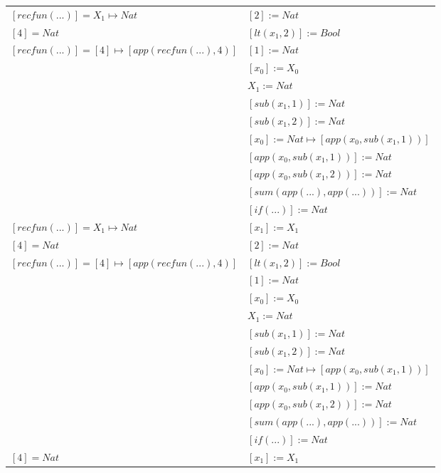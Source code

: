 \begin{exercise}
\begin{description}
\begin{center}
\begin{longtable}{ | l | l | }
                        $[recfun(...)] = X_1 \mapsto Nat$ & $[2] := Nat$ \\
                        $[4] = Nat$ & $[lt(x_1 , 2)] := Bool$ \\
                        $[recfun(...)] = [4] \mapsto [app(recfun(...), 4)]$ & $[1] := Nat$\\
                        & $[x_0] := X_0$ \\
                        & $X_1 := Nat$ \\
                        & $[sub(x_1,1)] := Nat$ \\
                        & $[sub(x_1,2)] := Nat$ \\
                        & $[x_0] := Nat \mapsto [app(x_0, sub(x_1,1))]$ \\
                        & $[app(x_0, sub(x_1,1))] := Nat$ \\
                        & $[app(x_0, sub(x_1,2))] := Nat$ \\
                        & $[sum(app(...), app(...))] := Nat$ \\
                        & $[if(...)] := Nat $ \\
                    \hline
                        $[recfun(...)] = X_1 \mapsto Nat$ &$[x_1] := X_1$ \\
                        $[4] = Nat$ &  $[2] := Nat$ \\
                        $[recfun(...)] = [4] \mapsto [app(recfun(...), 4)]$ & $[lt(x_1 , 2)] := Bool$ \\
                        & $[1] := Nat$ \\
                        & $[x_0] := X_0$ \\
                        & $X_1 := Nat$  \\
                        & $[sub(x_1,1)] := Nat$ \\
                        & $[sub(x_1,2)] := Nat$ \\
                        & $[x_0] := Nat \mapsto [app(x_0, sub(x_1,1))]$ \\
                        & $[app(x_0, sub(x_1,1))] := Nat$ \\
                        & $[app(x_0, sub(x_1,2))] := Nat$ \\
                        & $[sum(app(...), app(...))] := Nat$ \\
                        & $[if(...)] := Nat $ \\
                    \hline
                        $[4] = Nat$ &  $[x_1] := X_1$ \\

\end{longtable}
\end{center}
\end{description}
\end{exercise}
